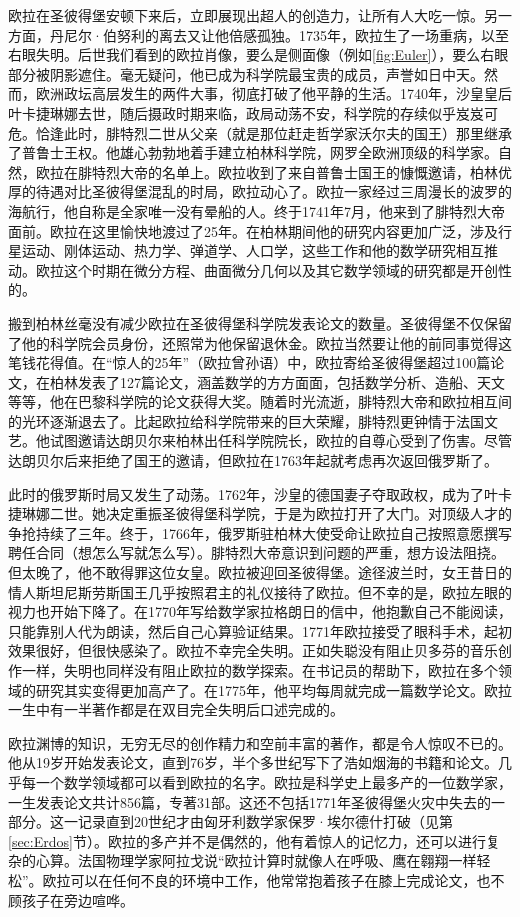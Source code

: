\documentclass[b5paper]{ctexart}
\begin{document}
\begin{mdframed}
欧拉在圣彼得堡安顿下来后，立即展现出超人的创造力，让所有人大吃一惊。另一方面，丹尼尔·伯努利的离去又让他倍感孤独。1735年，欧拉生了一场重病，以至右眼失明。后世我们看到的欧拉肖像，要么是侧面像（例如\cref{fig:Euler}），要么右眼部分被阴影遮住。毫无疑问，他已成为科学院最宝贵的成员，声誉如日中天。然而，欧洲政坛高层发生的两件大事，彻底打破了他平静的生活。1740年，沙皇皇后叶卡捷琳娜去世，随后摄政时期来临，政局动荡不安，科学院的存续似乎岌岌可危。恰逢此时，腓特烈二世从父亲（就是那位赶走哲学家沃尔夫的国王）那里继承了普鲁士王权\footnotemark。他雄心勃勃地着手建立柏林科学院，网罗全欧洲顶级的科学家。自然，欧拉在腓特烈大帝的名单上。欧拉收到了来自普鲁士国王的慷慨邀请，柏林优厚的待遇对比圣彼得堡混乱的时局，欧拉动心了。欧拉一家经过三周漫长的波罗的海航行，他自称是全家唯一没有晕船的人。终于1741年7月，他来到了腓特烈大帝面前。欧拉在这里愉快地渡过了25年。在柏林期间他的研究内容更加广泛，涉及行星运动、刚体运动、热力学、弹道学、人口学，这些工作和他的数学研究相互推动。欧拉这个时期在微分方程、曲面微分几何以及其它数学领域的研究都是开创性的。

搬到柏林丝毫没有减少欧拉在圣彼得堡科学院发表论文的数量。圣彼得堡不仅保留了他的科学院会员身份，还照常为他保留退休金。欧拉当然要让他的前同事觉得这笔钱花得值。在“惊人的25年”（欧拉曾孙语）中，欧拉寄给圣彼得堡超过100篇论文，在柏林发表了127篇论文，涵盖数学的方方面面，包括数学分析、造船、天文等等，他在巴黎科学院的论文获得大奖。随着时光流逝，腓特烈大帝和欧拉相互间的光环逐渐退去了。比起欧拉给科学院带来的巨大荣耀，腓特烈更钟情于法国文艺。他试图邀请达朗贝尔来柏林出任科学院院长，欧拉的自尊心受到了伤害。尽管达朗贝尔后来拒绝了国王的邀请，但欧拉在1763年起就考虑再次返回俄罗斯了。

此时的俄罗斯时局又发生了动荡。1762年，沙皇的德国妻子夺取政权，成为了叶卡捷琳娜二世。她决定重振圣彼得堡科学院，于是为欧拉打开了大门。对顶级人才的争抢持续了三年。终于，1766年，俄罗斯驻柏林大使受命让欧拉自己按照意愿撰写聘任合同（想怎么写就怎么写）。腓特烈大帝意识到问题的严重，想方设法阻挠。但太晚了，他不敢得罪这位女皇。欧拉被迎回圣彼得堡。途径波兰时，女王昔日的情人斯坦尼斯劳斯国王几乎按照君主的礼仪接待了欧拉。但不幸的是，欧拉左眼的视力也开始下降了。在1770年写给数学家拉格朗日的信中，他抱歉自己不能阅读，只能靠别人代为朗读，然后自己心算验证结果。1771年欧拉接受了眼科手术，起初效果很好，但很快感染了。欧拉不幸完全失明\cite{Weil-1983}。正如失聪没有阻止贝多芬的音乐创作一样，失明也同样没有阻止欧拉的数学探索\cite{HanXueTao2009}。在书记员的帮助下，欧拉在多个领域的研究其实变得更加高产了。在1775年，他平均每周就完成一篇数学论文。欧拉一生中有一半著作都是在双目完全失明后口述完成的。

欧拉渊博的知识，无穷无尽的创作精力和空前丰富的著作，都是令人惊叹不已的。他从19岁开始发表论文，直到76岁，半个多世纪写下了浩如烟海的书籍和论文。几乎每一个数学领域都可以看到欧拉的名字。欧拉是科学史上最多产的一位数学家，一生发表论文共计856篇，专著31部。这还不包括1771年圣彼得堡火灾中失去的一部分。这一记录直到20世纪才由匈牙利数学家保罗·埃尔德什打破（见第\ref{sec:Erdos}节）。欧拉的多产并不是偶然的，他有着惊人的记忆力，还可以进行复杂的心算。法国物理学家阿拉戈说“欧拉计算时就像人在呼吸、鹰在翱翔一样轻松”。欧拉可以在任何不良的环境中工作，他常常抱着孩子在膝上完成论文，也不顾孩子在旁边喧哗。


\end{mdframed}
\end{document}

